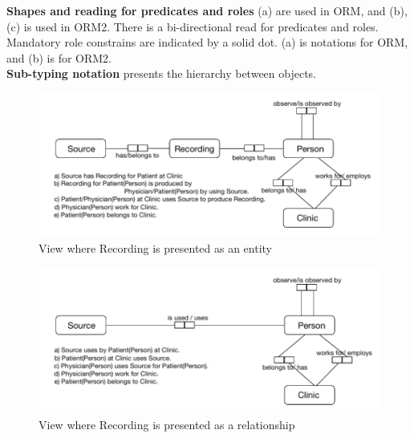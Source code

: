 \textbf{Shapes and reading for predicates and roles} (a) are used in ORM, and (b), (c) is used in ORM2. There is a bi-directional read for predicates and roles.\\
Mandatory role constrains are indicated by a solid dot. (a) is notations for ORM, and (b) is for ORM2.\\
\textbf{Sub-typing notation} presents the hierarchy between objects.\\
\begin{figure}[ht]
    \centering
    \includegraphics[width=1.0\textwidth]{Figures/ConceptDB1.png}
    \caption{View where Recording is presented as an entity}
    \label{fig:Figures/ConceptDB1}
\end{figure}
\begin{figure}[ht]
    \centering
    \includegraphics[width=1.0\textwidth]{Figures/ConceptDB2.png}
    \caption{View where Recording is presented as a relationship}
    \label{fig:Figures/ConceptDB2}
\end{figure}
